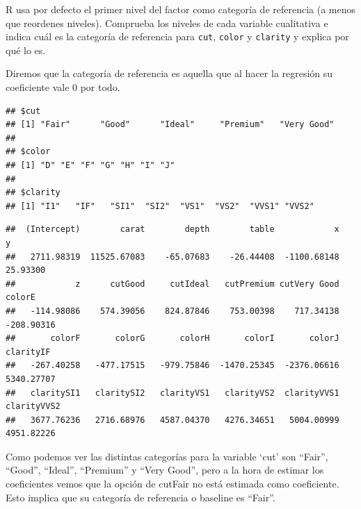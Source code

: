 \documentclass[
  spanish,
]{article}
\newenvironment{Shaded}{\begin{snugshade}}{\end{snugshade}}
\newcommand{\NormalTok}[1]{#1}
\newcommand{\SpecialCharTok}[1]{\textcolor[rgb]{0.81,0.36,0.00}{\textbf{#1}}}
\begin{document}
R usa por defecto el primer nivel del factor como categoría de
referencia (a menos que reordenes niveles). Comprueba los niveles de
cada variable cualitativa e indica cuál es la categoría de referencia
para \texttt{cut}, \texttt{color} y \texttt{clarity} y explica por qué
lo es.

Diremos que la categoría de referencia es aquella que al hacer la
regresión su coeficiente vale 0 por todo.

\begin{Shaded}
\end{Shaded}

\begin{verbatim}
## $cut
## [1] "Fair"      "Good"      "Ideal"     "Premium"   "Very Good"
## 
## $color
## [1] "D" "E" "F" "G" "H" "I" "J"
## 
## $clarity
## [1] "I1"   "IF"   "SI1"  "SI2"  "VS1"  "VS2"  "VVS1" "VVS2"
\end{verbatim}

\begin{Shaded}
\end{Shaded}

\begin{verbatim}
##  (Intercept)        carat        depth        table            x            y 
##   2711.98319  11525.67083    -65.07683    -26.44408  -1100.68148     25.93300 
##            z      cutGood     cutIdeal   cutPremium cutVery Good       colorE 
##   -114.98086    574.39056    824.87846    753.00398    717.34138   -208.90316 
##       colorF       colorG       colorH       colorI       colorJ    clarityIF 
##   -267.40258   -477.17515   -979.75846  -1470.25345  -2376.06616   5340.27707 
##   claritySI1   claritySI2   clarityVS1   clarityVS2  clarityVVS1  clarityVVS2 
##   3677.76236   2716.68976   4587.04370   4276.34651   5004.00999   4951.82226
\end{verbatim}

Como podemos ver las distintas categorías para la variable `cut' son
``Fair'', ``Good'', ``Ideal'', ``Premium'' y ``Very Good'', pero a la
hora de estimar los coeficientes vemos que la opción de cutFair no está
estimada como coeficiente. Esto implica que su categoría de referencia o
baseline es ``Fair''.
\end{document}
